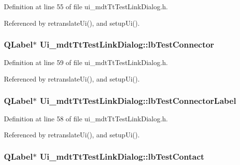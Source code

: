 Definition at line 55 of file ui\-\_\-mdt\-Tt\-Test\-Link\-Dialog.\-h.



Referenced by retranslate\-Ui(), and setup\-Ui().

\hypertarget{class_ui__mdt_tt_test_link_dialog_a425d54d98c98099b3977d845051b2245}{
\subsubsection[{lb\-Test\-Connector}]{\setlength{\rightskip}{0pt plus 5cm}Q\-Label$\ast$ Ui\-\_\-mdt\-Tt\-Test\-Link\-Dialog\-::lb\-Test\-Connector}}\label{class_ui__mdt_tt_test_link_dialog_a425d54d98c98099b3977d845051b2245}


Definition at line 59 of file ui\-\_\-mdt\-Tt\-Test\-Link\-Dialog.\-h.



Referenced by retranslate\-Ui(), and setup\-Ui().

\hypertarget{class_ui__mdt_tt_test_link_dialog_a41e738b11e495b39941f0d7e44b0d8c5}{
\subsubsection[{lb\-Test\-Connector\-Label}]{\setlength{\rightskip}{0pt plus 5cm}Q\-Label$\ast$ Ui\-\_\-mdt\-Tt\-Test\-Link\-Dialog\-::lb\-Test\-Connector\-Label}}\label{class_ui__mdt_tt_test_link_dialog_a41e738b11e495b39941f0d7e44b0d8c5}


Definition at line 58 of file ui\-\_\-mdt\-Tt\-Test\-Link\-Dialog.\-h.



Referenced by retranslate\-Ui(), and setup\-Ui().

\hypertarget{class_ui__mdt_tt_test_link_dialog_ab505ede9ab53e3850cab1641a20b3c1c}{
\subsubsection[{lb\-Test\-Contact}]{\setlength{\rightskip}{0pt plus 5cm}Q\-Label$\ast$ Ui\-\_\-mdt\-Tt\-Test\-Link\-Dialog\-::lb\-Test\-Contact}}\label{class_ui__mdt_tt_test_link_dialog_ab505ede9ab53e3850cab1641a20b3c1c}


